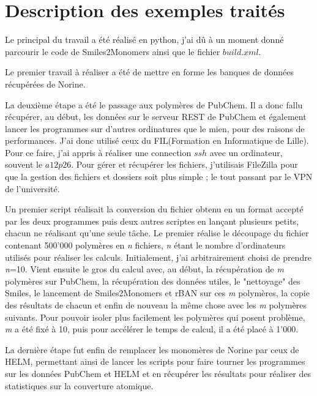 \documentclass[11pt, a4paper]{report}
\begin{document}
	\chapter{Description des exemples traités}
	Le principal du travail a été réalisé en python, j'ai dû à un moment donné parcourir le code de Smiles2Monomers ainsi que le fichier $build.xml$.
	
	Le premier travail à réaliser a été de mettre en forme les banques de données récupérées de Norine.
	
	La deuxième étape a été le passage aux polymères de PubChem. Il a donc fallu récupérer, au début, les données sur le serveur REST de PubChem et également lancer les programmes  sur d'autres ordinatures que le mien, pour des raisons de performances. J'ai donc utilisé ceux du FIL(Formation en Informatique de Lille). Pour ce faire, j'ai appris à réaliser une connection $ssh$ avec un ordinateur, souvent le $a12p26$. Pour gérer et récupérer les fichiers, j'utilisais FileZilla pour que la gestion des fichiers et dossiers soit plus simple ; le tout passant par le VPN de l'université.
	
	Un premier script réalisait la conversion du fichier obtenu en un format accepté par les deux programmes puis deux autres scriptes en lançant plusieurs petits, chacun ne réalisant qu'une seule tâche. Le premier réalise le découpage du fichier contenant 500'000 polymères en \textit{n} fichiers, \textit{n} étant le nombre d'ordinateurs utilisés pour réaliser les calculs. Initialement, j'ai arbitrairement choisi de prendre \textit{n}=10. Vient ensuite le gros du calcul avec, au début, la récupération de \textit{m} polymères sur PubChem, la récupération des données utiles, le "nettoyage" des Smiles, le lancement de Smiles2Monomers et rBAN sur ces \textit{m} polymères, la copie des résultats de chacun et enfin de nouveau la même chose avec les \textit{m} polymères suivants. Pour pouvoir isoler plus facilement les polymères qui posent problème, \textit{m} a été fixé à 10, puis pour accélérer le temps de calcul, il a été placé à 1'000.
	
	La dernière étape fut enfin de remplacer les monomères de Norine par ceux de HELM, permettant ainsi de lancer les scripts pour faire tourner les programmes sur les données PubChem et HELM et en récupérer les résultats pour réaliser des statistiques sur la couverture atomique.
	
\end{document}
